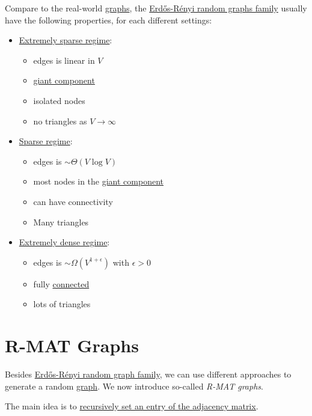 Compare to the real-world \hyperref[def:graph]{graphs}, the \hyperref[sec:Erdos-Renyi-random-graphs-family]{Erdős-Rényi random graphs family} usually have the following properties, for each different settings:
\begin{itemize}
	\item \hyperref[subsec:extremely-sparse-regime]{Extremely sparse regime}:
	      \begin{itemize}
		      \item edges is linear in \(V\)
		      \item \hyperref[def:giant-component]{giant component}
		      \item isolated nodes
		      \item no triangles as \(V\to \infty \)
	      \end{itemize}
	\item \hyperref[subsec:sparse-regime]{Sparse regime}:
	      \begin{itemize}
		      \item edges is \(\sim \Theta(V\log V)\)
		      \item most nodes in the \hyperref[def:giant-component]{giant component}
		      \item can have connectivity
		      \item Many triangles
	      \end{itemize}
	\item \hyperref[subsec:extremely-dense-regime]{Extremely dense regime}:
	      \begin{itemize}
		      \item edges is \(\sim \Omega(V^{1+\epsilon})\) with \(\epsilon>0\)
		      \item fully \hyperref[def:connected]{connected}
		      \item lots of triangles
	      \end{itemize}
\end{itemize}

\section{R-MAT Graphs}\label{sec:R-MAT-graphs}
Besides \hyperref[sec:Erdos-Renyi-random-graphs-family]{Erdős-Rényi random graph family}, we can use different approaches to generate a random \hyperref[def:graph]{graph}. We now introduce so-called \emph{R-MAT graphs}.

\begin{intuition}
	The main idea is to \underline{recursively set an entry of the \hyperref[def:adjacency-matrix]{adjacency matrix}}.
\end{intuition}


